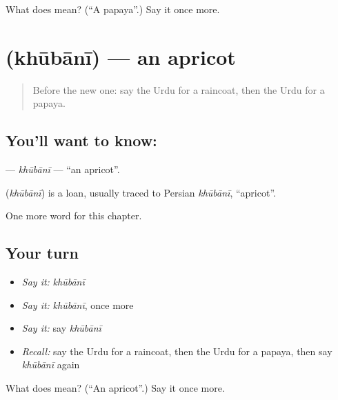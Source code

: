\begin{tcolorbox}[breakable,colback=teal!4,colframe=teal!35!black,title={Before you move on}]
What does  mean? (\textquotedblleft{}A papaya\textquotedblright{}.) Say it once more.
\end{tcolorbox}
\section[\texorpdfstring{\ur{خوبانی} (khūbānī)}{خوبانی (khūbānī)}]{ (khūbānī) — an apricot}

\label{lesson:UR-C252-khubani}



\begin{quote}
Before the new one: say the Urdu for a raincoat, then the Urdu for a papaya.
\end{quote}

\subsection*{You'll want to know: }
\textbf{} — \emph{khūbānī} — \textquotedblleft{}an apricot\textquotedblright{}.

\begin{cousinweb}
\textbf{} (\emph{khūbānī}) is a loan, usually traced to Persian \emph{khūbānī}, \textquotedblleft{}apricot\textquotedblright{}.
\end{cousinweb}

\begin{grammarlens}[title={What you've built}]
One more word for this chapter.
\end{grammarlens}

\subsection*{Your turn}
\begin{itemize}
\raggedright
  \item \emph{Say it:} \emph{khūbānī}
  \item \emph{Say it:} \emph{khūbānī}, once more
  \item \emph{Say it:} say \emph{khūbānī}
  \item \emph{Recall:} say the Urdu for a raincoat, then the Urdu for a papaya, then say \emph{khūbānī} again
\end{itemize}

\begin{tcolorbox}[breakable,colback=teal!4,colframe=teal!35!black,title={Before you move on}]
What does  mean? (\textquotedblleft{}An apricot\textquotedblright{}.) Say it once more.
\end{tcolorbox}
